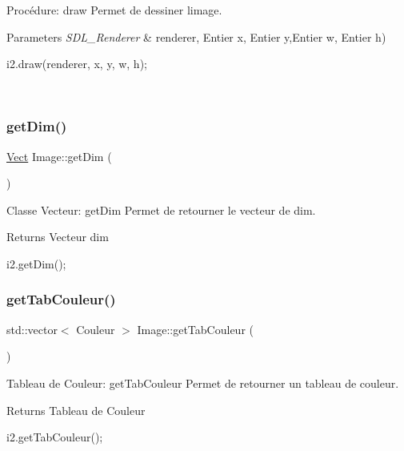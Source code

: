 Procédure\+: draw Permet de dessiner l\textquotesingle{}image. 


\begin{DoxyParams}{Parameters}
{\em S\+D\+L\+\_\+\+Renderer} & renderer, Entier x, Entier y,Entier w, Entier h) 
\begin{DoxyCode}
i2.draw(renderer, x, y, w, h);
\end{DoxyCode}
 \\
\hline
\end{DoxyParams}
\mbox{\label{classImage_a19886e6e2f661123224101aebdab0659}} 
\subsubsection{\texorpdfstring{get\+Dim()}{getDim()}}
{\footnotesize\ttfamily \hyperlink{classVect}{Vect} Image\+::get\+Dim (\begin{DoxyParamCaption}{ }\end{DoxyParamCaption})}



Classe Vecteur\+: get\+Dim Permet de retourner le vecteur de dim. 

\begin{DoxyReturn}{Returns}
Vecteur dim 
\begin{DoxyCode}
i2.getDim();
\end{DoxyCode}
 
\end{DoxyReturn}
\mbox{\label{classImage_a61a9499054fb7982ca74f7e408617df5}} 
\subsubsection{\texorpdfstring{get\+Tab\+Couleur()}{getTabCouleur()}}
{\footnotesize\ttfamily std\+::vector$<$ Couleur $>$ Image\+::get\+Tab\+Couleur (\begin{DoxyParamCaption}{ }\end{DoxyParamCaption})}



Tableau de Couleur\+: get\+Tab\+Couleur Permet de retourner un tableau de couleur. 

\begin{DoxyReturn}{Returns}
Tableau de Couleur 
\begin{DoxyCode}
i2.getTabCouleur();
\end{DoxyCode}
 
\end{DoxyReturn}
\mbox{\label{classImage_ae9e27e310b4322d04366f2882f3a4242}} 
